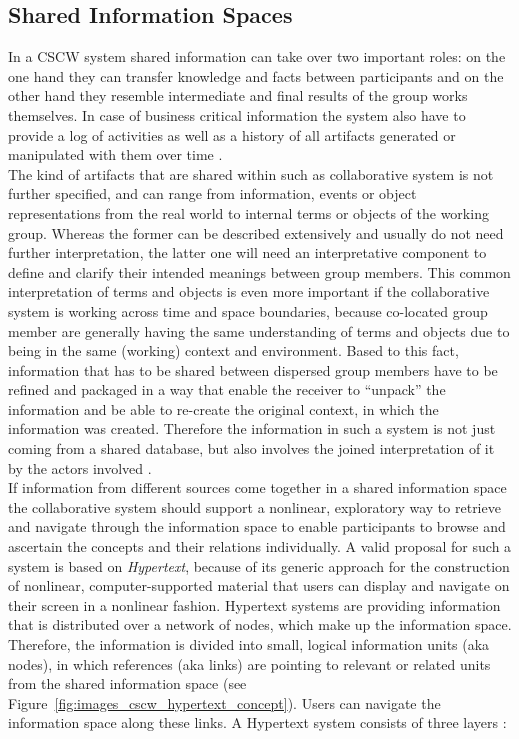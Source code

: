 
\subsection{Shared Information Spaces}
\label{sec:cscw_shared_spaces}

In a \gls{CSCW} system shared information can take over two important roles: on the one hand they can transfer knowledge and facts between participants and on the other hand they resemble intermediate and final results of the group works themselves. In case of business critical information the system also have to provide a log of activities as well as a history of all artifacts generated or manipulated with them over time \citep[pg. 295]{borghoff2000computer}. \\

The kind of artifacts that are shared within such as collaborative system is not further specified, and can range from information, events or object representations from the real world to internal terms or objects of the working group. Whereas the former can be described extensively and usually do not need further interpretation, the latter one will need an interpretative component to define and clarify their intended meanings between group members. This common interpretation of terms and objects is even more important if the collaborative system is working across time and space boundaries, because co-located group member are generally having the same understanding of terms and objects due to being in the same (working) context and environment. Based to this fact, information that has to be shared between dispersed group members have to be refined and packaged in a way that enable the receiver to ``unpack'' the information and be able to re-create the original context, in which the information was created. Therefore the information in such a system is not just coming from a shared database, but also involves the joined interpretation of it by the actors involved \citep{bannon1997constructing}. \\

If information from different sources come together in a shared information space the collaborative system should support a nonlinear, exploratory way to retrieve and navigate through the information space to enable participants to browse and ascertain the concepts and their relations individually. A valid proposal for such a system is based on \emph{Hypertext}, because of its generic approach for the construction of nonlinear, computer-supported material that users can display and navigate on their screen in a nonlinear fashion. Hypertext systems are providing information that is distributed over a network of nodes, which make up the information space. Therefore, the information is divided into small, logical information units (aka nodes), in which references (aka links) are pointing to relevant or related units from the shared information space (see Figure~\ref{fig:images_cscw_hypertext_concept}). Users can navigate the information space along these links. A Hypertext system consists of three layers \citep[pg. 295-307]{borghoff2000computer}: \@

